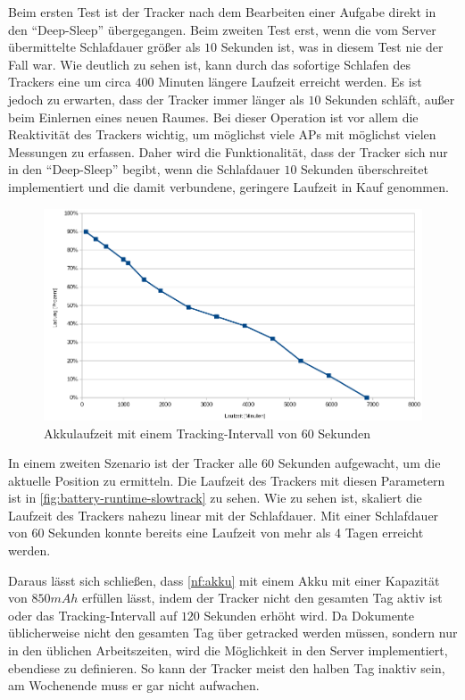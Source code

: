 Beim ersten Test ist der Tracker nach dem Bearbeiten einer Aufgabe direkt in den \enquote{Deep-Sleep}
übergegangen. Beim zweiten Test erst, wenn die vom Server übermittelte Schlafdauer größer als $10$
Sekunden ist, was in diesem Test nie der Fall war. Wie deutlich zu sehen ist, kann durch das
sofortige Schlafen des Trackers eine um circa $400$ Minuten längere Laufzeit erreicht werden. Es ist
jedoch zu erwarten, dass der Tracker immer länger als $10$ Sekunden schläft, außer beim Einlernen
eines neuen Raumes. Bei dieser Operation ist vor allem die Reaktivität des Trackers wichtig, um
möglichst viele \glspl{AP} mit möglichst vielen Messungen zu erfassen. Daher wird die
Funktionalität, dass der Tracker sich nur in den \enquote{Deep-Sleep} begibt, wenn die Schlafdauer
$10$ Sekunden überschreitet implementiert und die damit verbundene, geringere Laufzeit in Kauf
genommen.

\begin{figure}[htbp]
	\centering
	\includegraphics[width=.6\textwidth]{images/battery-runtime-slowtrack2.png}
	\caption{Akkulaufzeit mit einem Tracking-Intervall von 60 Sekunden}
	\label{fig:battery-runtime-slowtrack}
\end{figure}

In einem zweiten Szenario ist der Tracker alle $60$ Sekunden aufgewacht, um die aktuelle Position
zu ermitteln. Die Laufzeit des Trackers mit diesen Parametern ist in
\autoref{fig:battery-runtime-slowtrack} zu sehen. Wie zu sehen ist, skaliert die Laufzeit des
Trackers nahezu linear mit der Schlafdauer. Mit einer Schlafdauer von $60$ Sekunden konnte bereits
eine Laufzeit von mehr als 4 Tagen erreicht werden.

Daraus lässt sich schließen, dass \ref*{nf:akku} mit einem \gls{Akku} mit einer Kapazität von $850
mAh$ erfüllen lässt, indem der Tracker nicht den gesamten Tag aktiv ist oder das Tracking-Intervall
auf $120$ Sekunden erhöht wird. Da Dokumente üblicherweise nicht den gesamten Tag über getracked
werden müssen, sondern nur in den üblichen Arbeitszeiten, wird die Möglichkeit in den Server
implementiert, ebendiese zu definieren. So kann der Tracker meist den halben Tag inaktiv sein, am
Wochenende muss er gar nicht aufwachen.

